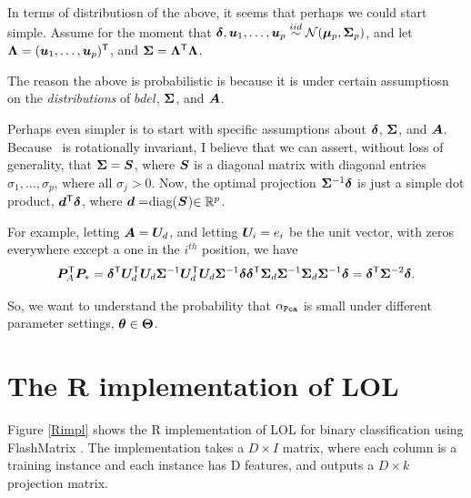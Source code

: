 \documentclass[10pt]{article}
\begin{document}
In terms of distributiosn of the above, it seems that perhaps we could start simple.
Assume for the moment that $\boldsymbol{\delta},\boldsymbol{u}_1,\ldots,\boldsymbol{u}_p \overset{iid}{\sim} \mathcal{N}(\boldsymbol{\mu}_p, \boldsymbol{\Sigma}_p)$, and let $\boldsymbol{\Lambda}=(\boldsymbol{u}_1,\ldots,\boldsymbol{u}_p)^{\mathsf{T}}$, and $\boldsymbol{\Sigma} = \boldsymbol{\Lambda}^{\mathsf{T}} \boldsymbol{\Lambda}$.

The reason the above is probabilistic is because it is under certain assumptiosn on the \emph{distributions} of $bdel$, $\boldsymbol{\Sigma}$, and $\boldsymbol{A}$.


Perhaps even simpler is to start with specific assumptions about $\boldsymbol{\delta}$, $\boldsymbol{\Sigma}$, and $\boldsymbol{A}$. Because \Lda~is rotationally invariant, I believe that we can assert, without loss of generality, that $\boldsymbol{\Sigma}=\boldsymbol{S}$, where $\boldsymbol{S}$ is a diagonal matrix with diagonal entries $\sigma_1,\ldots, \sigma_p$, where all $\sigma_j > 0$.
Now, the optimal projection $\boldsymbol{\Sigma}^{-1} \boldsymbol{\delta}$ is just a simple dot product,  $\boldsymbol{d}^{\mathsf{T}} \boldsymbol{\delta}$, where $\boldsymbol{d}=$diag($\boldsymbol{S}$)$\in \mathbb{R}^p$.


For example, letting $\boldsymbol{A}=\boldsymbol{U}_d$, and letting $\boldsymbol{U}_i=e_i$ be the unit vector, with zeros everywhere except a one in the $i^{th}$ position,  we have
\begin{align*}
\bP_A\T \bP_* %
= \bdel\T \bU_d\T \bU_d \bSig^{-1} \bU_d\T \bU_d \bSig^{-1} \bdel %
\bdel\T \bSig_d \bSig^{-1} \bSig_d \bSig^{-1} \bdel %
= \bdel\T \bSig^{-2} \bdel.
\end{align*}






So, we want to understand the probability that $\alpha_{{\sc \texttt{Pca}}}$ is small under different parameter settings, $\boldsymbol{\theta} \in \boldsymbol{\Theta}$.


\section{The R implementation of LOL}

Figure \ref{Rimpl} shows the R implementation of LOL for binary classification
using FlashMatrix \cite{FlashMatrix}. The implementation takes a $D \times I$
matrix, where each column is a training instance and each instance has D
features, and outputs a $D \times k$ projection matrix.
\end{document}
